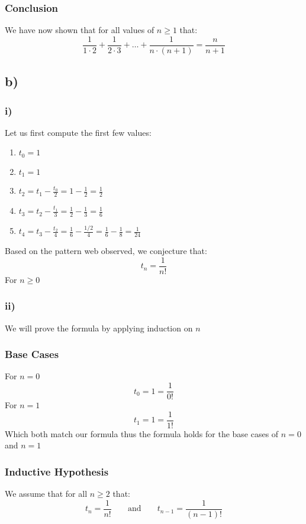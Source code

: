 \documentclass{article}
\begin{document}
\subsubsection*{Conclusion}
We have now shown that for all values of $n\geq 1$ that: $$\frac{1}{1\cdot 2}+\frac{1}{2\cdot 3}+\dots+\frac{1}{n\cdot (n+1)}=\frac{n}{n+1}$$
\subsection*{b)}
\subsubsection*{i)}
Let us first compute the first few values:
\begin{enumerate}
  \item $t_{0}=1$
  \item $t_{1}=1$
  \item $t_{2}=t_{1}-\frac{t_{0}}{2}=1-\frac{1}{2}=\frac{1}{2}$
  \item $t_{3}=t_{2}-\frac{t_{1}}{3}=\frac{1}{2}-\frac{1}{3}=\frac{1}{6}$
  \item $t_{4}=t_{3}-\frac{t_{2}}{4}=\frac{1}{6}-\frac{1/2}{4}=\frac{1}{6}-\frac{1}{8}=\frac{1}{24}$
\end{enumerate}
Based on the pattern web observed, we conjecture that: $$t_{n}=\frac{1}{n!}$$For $n\geq 0$
\newpage
\subsubsection*{ii)}
We will prove the formula by applying induction on $n$
\subsubsection*{Base Cases}
For $n=0$ $$t_{0}=1=\frac{1}{0!}$$
For $n=1$ $$t_{1}=1=\frac{1}{1!}$$
Which both match our formula thus the formula holds for the base cases of $n=0$ and $n=1$

\subsubsection*{Inductive Hypothesis}
We assume that for all $n\geq 2$ that: $$t_{n}=\frac{1}{n!}\;\;\;\;\;\;\;\text{and}\;\;\;\;\;\;\;t_{n-1}=\frac{1}{(n-1)!}$$
\end{document}
